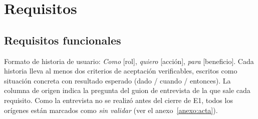 \section{Requisitos}

\subsection{Requisitos funcionales}

Formato de historia de usuario: \emph{Como} [rol], \emph{quiero} [acción], \emph{para}
[beneficio]. Cada historia lleva al menos dos criterios de aceptación verificables, escritos como
situación concreta con resultado esperado (dado / cuando / entonces).
La columna de origen indica la pregunta del guion de entrevista de la que sale cada requisito.
Como la entrevista no se realizó antes del cierre de E1, todos los orígenes están marcados como
\emph{sin validar} (ver el anexo~\ref{anexo:acta}).


